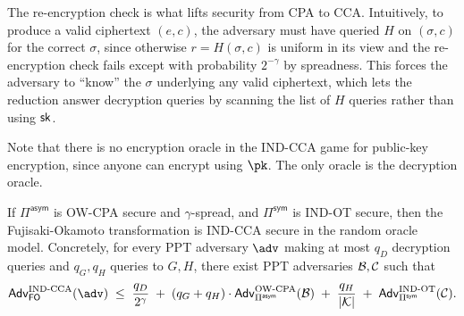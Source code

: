 The re-encryption check is what lifts security from CPA to CCA. Intuitively, to produce a valid ciphertext $(e, c)$, the adversary must have queried $H$ on $(\sigma, c)$ for the correct $\sigma$, since otherwise $r = H(\sigma, c)$ is uniform in its view and the re-encryption check fails except with probability $2^{-\gamma}$ by spreadness. This forces the adversary to ``know'' the $\sigma$ underlying any valid ciphertext, which lets the reduction answer decryption queries by scanning the list of $H$ queries rather than using $\mathsf{sk}$.

Note that there is no encryption oracle in the IND-CCA game for public-key encryption, since anyone can encrypt using $\pk$. The only oracle is the decryption oracle.

\begin{theorem}
    If $\Pi^{\mathsf{asym}}$ is OW-CPA secure and $\gamma$-spread, and $\Pi^{\mathsf{sym}}$ is IND-OT secure, then the Fujisaki-Okamoto transformation is IND-CCA secure in the random oracle model. Concretely, for every PPT adversary $\adv$ making at most $q_D$ decryption queries and $q_G, q_H$ queries to $G, H$, there exist PPT adversaries $\mathcal{B}, \mathcal{C}$ such that
    \[
        \mathsf{Adv}^{\text{IND-CCA}}_{\mathsf{FO}}(\adv)
        \;\leq\;
        \frac{q_D}{2^\gamma}
        \;+\;
        (q_G + q_H) \cdot \mathsf{Adv}^{\text{OW-CPA}}_{\Pi^{\mathsf{asym}}}(\advb)
        \;+\;
        \frac{q_H}{|\mathcal{K}|}
        \;+\;
        \mathsf{Adv}^{\text{IND-OT}}_{\Pi^{\mathsf{sym}}}(\mathcal{C}).
    \]
\end{theorem}

